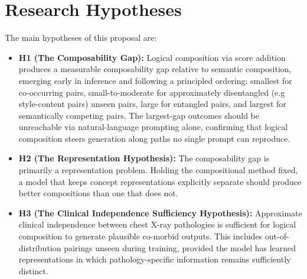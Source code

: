 
\section{Research Hypotheses}
\label{sec:research_objectives_research_hypothesis}

The main hypotheses of this proposal are:
\begin{itemize}
    \item \textbf{H1 (The Composability Gap):}
    Logical composition via score addition produces a measurable composability gap relative to semantic composition, emerging early in inference and following a principled ordering: smallest for co-occurring pairs, small-to-moderate for approximately disentangled (e.g style-content pairs) unseen pairs, large for entangled pairs, and largest for semantically competing pairs.
    The largest-gap outcomes should be unreachable via natural-language prompting alone, confirming that logical composition steers generation along paths no single prompt can reproduce.

    \item \textbf{H2 (The Representation Hypothesis):}
    The composability gap is primarily a representation problem.
    Holding the compositional method fixed, a model that keeps concept representations explicitly separate should produce better compositions than one that does not.

    \item \textbf{H3 (The Clinical Independence Sufficiency Hypothesis):}
    Approximate clinical independence between chest X-ray pathologies is sufficient for logical composition to generate plausible co-morbid outputs. This includes out-of-distribution pairings unseen during training, provided the model has learned representations in which pathology-specific information remains sufficiently distinct.

\end{itemize}
